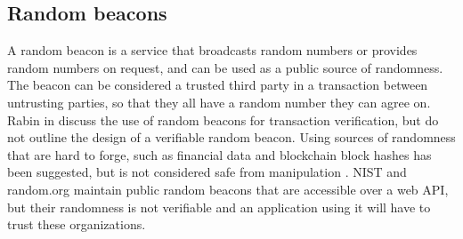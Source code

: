 \subsection{Random beacons}
A random beacon is a service that broadcasts random numbers or provides random numbers on request, and can be used as a public source of randomness. The beacon can be considered a trusted third party in a transaction between untrusting parties, so that they all have a random number they can agree on. Rabin in \cite{rabin1983transaction} discuss the use of random beacons for transaction verification, but do not outline the design of a verifiable random beacon. Using sources of randomness that are hard to forge, such as financial data \cite{clark_use_2010} and blockchain block hashes \cite{bentov_bitcoin_2016} \cite{yajam_improvement_2019} has been suggested, but is not considered safe from manipulation \cite{bonneau2015bitcoin} \cite{pierrot_malleability_2018}. NIST \cite{nist_nist_2019} and random.org maintain public random beacons that are accessible over a web API, but their randomness is not verifiable and an application using it will have to trust these organizations. 
